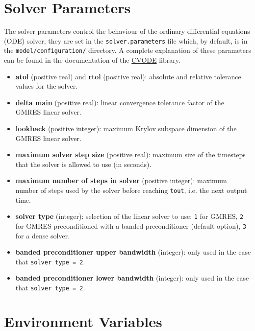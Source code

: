 \section{Solver Parameters} \label{sec:solver-parameters}

The solver parameters control the behaviour of the ordinary
differential equations (ODE) solver; they are set in the
\texttt{solver.parameters} file which, by default, is in the
\texttt{model/configuration/} directory. A complete explanation of
these parameters can be found in the documentation of the
\href{https://computation.llnl.gov/projects/sundials/sundials-software}{CVODE}
library.

\begin{itemize}
\item \textbf{atol} (positive real) and \textbf{rtol} (positive real):
  absolute and relative tolerance values for the solver.
\item \textbf{delta main} (positive real): linear convergence
  tolerance factor of the GMRES linear solver.
\item \textbf{lookback} (positive integer): maximum Krylov subspace
  dimension of the GMRES linear solver.
\item \textbf{maximum solver step size} (positive real): maximum size
  of the timesteps that the solver is allowed to use (in seconds).
\item \textbf{maximum number of steps in solver} (positive integer):
  maximum number of steps used by the solver before reaching
  \texttt{tout}, i.e. the next output time.
\item \textbf{solver type} (integer): selection of the linear solver
  to use: \texttt{1} for GMRES, \texttt{2} for GMRES preconditioned
  with a banded preconditioner (default option), \texttt{3} for a
  dense solver.
\item \textbf{banded preconditioner upper bandwidth} (integer): only
  used in the case that \texttt{solver\ type\ =\ 2}.
\item \textbf{banded preconditioner lower bandwidth} (integer): only
  used in the case that \texttt{solver\ type\ =\ 2}.
\end{itemize}

\section{Environment Variables} \label{sec:environment-variables}

